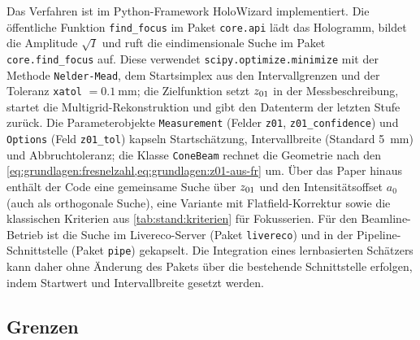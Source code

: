Das Verfahren ist im Python-Framework HoloWizard
\cite{dora2024framework,dora2026holowizard} implementiert. Die öffentliche
Funktion \texttt{find\_focus} im Paket \texttt{core.api} lädt das Hologramm,
bildet die Amplitude $\sqrt{I}$ und ruft die eindimensionale Suche im Paket
\texttt{core.find\_focus} auf. Diese verwendet
\texttt{scipy.optimize.minimize} mit der Methode \texttt{Nelder-Mead}, dem
Startsimplex aus den Intervallgrenzen und der Toleranz \texttt{xatol}
$= \qty{0.1}{\milli\metre}$; die Zielfunktion setzt $z_{01}$ in der
Messbeschreibung, startet die Multigrid-Rekonstruktion und gibt den
Datenterm der letzten Stufe zurück. Die Parameterobjekte
\texttt{Measurement} (Felder \texttt{z01}, \texttt{z01\_confidence}) und
\texttt{Options} (Feld \texttt{z01\_tol}) kapseln Startschätzung,
Intervallbreite (Standard \qty{5}{\milli\metre}) und Abbruchtoleranz; die
Klasse \texttt{ConeBeam} rechnet die Geometrie nach den
\cref{eq:grundlagen:fresnelzahl,eq:grundlagen:z01-aus-fr} um.
Über das Paper hinaus enthält der Code eine gemeinsame Suche über $z_{01}$
und den Intensitätsoffset $a_0$ (auch als orthogonale Suche), eine Variante
mit Flatfield-Korrektur sowie die klassischen Kriterien aus
\cref{tab:stand:kriterien} für Fokusserien. Für den Beamline-Betrieb ist
die Suche im Livereco-Server (Paket \texttt{livereco}) und in der
Pipeline-Schnittstelle (Paket \texttt{pipe}) gekapselt. Die Integration
eines lernbasierten Schätzers kann daher ohne Änderung des Pakets über die
bestehende Schnittstelle erfolgen, indem Startwert und Intervallbreite
gesetzt werden.

\subsection{Grenzen}

